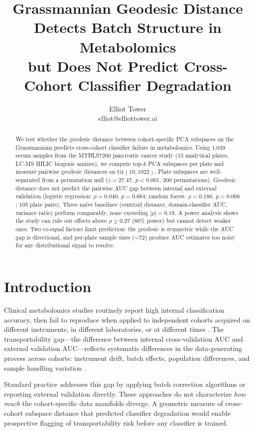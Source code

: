 \documentclass{article}
\title{Grassmannian Geodesic Distance Detects Batch Structure in Metabolomics\\but Does Not Predict Cross-Cohort Classifier Degradation}
\author{\name Elliot Tower \\
      \email elliot@elliottower.ai}
\begin{document}
\maketitle

\begin{abstract}
We test whether the geodesic distance between cohort-specific PCA subspaces on the Grassmannian predicts cross-cohort classifier failure in metabolomics. Using 1{,}039 serum samples from the MTBLS7260 pancreatic cancer study (15 analytical plates, LC-MS HILIC biogenic amines), we compute top-$k$ PCA subspaces per plate and measure pairwise geodesic distances on $\mathrm{Gr}(10, 1022)$. Plate subspaces are well-separated from a permutation null ($z = 27.47$, $p < 0.001$, 200 permutations). Geodesic distance does not predict the pairwise AUC gap between internal and external validation (logistic regression: $\rho = 0.040$, $p = 0.684$; random forest: $\rho = 0.180$, $p = 0.066$; 105 plate pairs). Three na\"{i}ve baselines (centroid distance, domain-classifier AUC, variance ratio) perform comparably, none exceeding $|\rho| = 0.19$. A power analysis shows the study can rule out effects above $\rho \geq 0.27$ (80\% power) but cannot detect weaker ones. Two co-equal factors limit prediction: the geodesic is symmetric while the AUC gap is directional, and per-plate sample sizes ($\sim$72) produce AUC estimates too noisy for any distributional signal to resolve.
\end{abstract}

\section{Introduction}

Clinical metabolomics studies routinely report high internal classification accuracy, then fail to reproduce when applied to independent cohorts acquired on different instruments, in different laboratories, or at different times \citep{broadhurst2006statistical}. The transportability gap---the difference between internal cross-validation AUC and external validation AUC---reflects systematic differences in the data-generating process across cohorts: instrument drift, batch effects, population differences, and sample handling variation \citep{wehrens2016improved}.

Standard practice addresses this gap by applying batch correction algorithms \citep{johnson2007adjusting} or reporting external validation directly. These approaches do not characterize \emph{how much} the cohort-specific data manifolds diverge. A geometric measure of cross-cohort subspace distance that predicted classifier degradation would enable prospective flagging of transportability risk before any classifier is trained.
\end{document}
